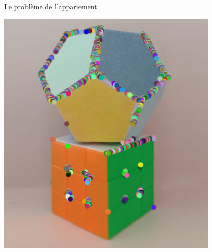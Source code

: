\begin{frame}{Le problème de l'appariement}
\begin{minipage}{0.48\linewidth}
    \includegraphics[width=\linewidth]{capture/test_detection_img2_1_moravec_2_500.jpeg}
  \end{minipage}
\end{frame}

